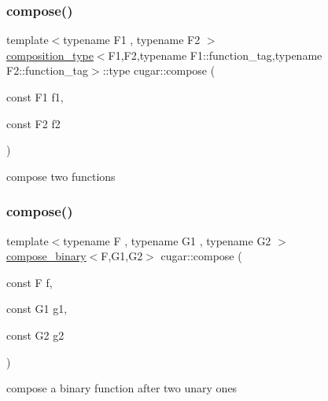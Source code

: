 \subsubsection{\texorpdfstring{compose()}{compose()}\hspace{0.1cm}{\footnotesize\ttfamily [1/2]}}
{\footnotesize\ttfamily template$<$typename F1 , typename F2 $>$ \\
\hyperlink{structcugar_1_1composition__type}{composition\+\_\+type}$<$F1,F2,typename F1\+::function\+\_\+tag,typename F2\+::function\+\_\+tag$>$\+::type cugar\+::compose (\begin{DoxyParamCaption}\item[{const F1}]{f1,  }\item[{const F2}]{f2 }\end{DoxyParamCaption})}

compose two functions \mbox{\label{group___basic_functors_gadbd492970eb013a975551b9cf4b846fe}} 
\subsubsection{\texorpdfstring{compose()}{compose()}\hspace{0.1cm}{\footnotesize\ttfamily [2/2]}}
{\footnotesize\ttfamily template$<$typename F , typename G1 , typename G2 $>$ \\
\hyperlink{structcugar_1_1compose__binary}{compose\+\_\+binary}$<$F,G1,G2$>$ cugar\+::compose (\begin{DoxyParamCaption}\item[{const F}]{f,  }\item[{const G1}]{g1,  }\item[{const G2}]{g2 }\end{DoxyParamCaption})}

compose a binary function after two unary ones 